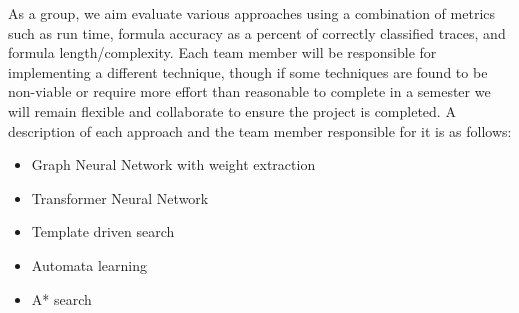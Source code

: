 \documentclass[12pt]{article}
\begin{document}
As a group, we aim evaluate various approaches using a combination of metrics such as run time, formula accuracy as a percent of correctly classified traces, and formula length/complexity.  
Each team member will be responsible for implementing a different technique, though if some techniques are found to be non-viable or require more effort than reasonable to complete in a semester we will remain flexible and collaborate to ensure the project is completed.
A description of each approach and the team member responsible for it is as follows:
\begin{itemize}
    \item Graph Neural Network with weight extraction
    \item Transformer Neural Network
    \item Template driven search
    \item Automata learning
    \item A* search
\end{itemize} 

\newpage
\end{document}
